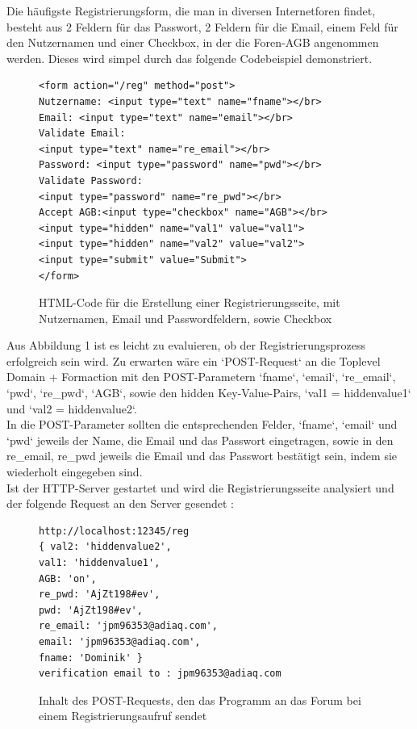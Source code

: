 Die häufigste Registrierungsform, die man in diversen Internetforen findet, besteht aus 2 Feldern für das Passwort, 2 Feldern für die Email, einem Feld für den Nutzernamen und einer Checkbox, in der die Foren-AGB angenommen werden. Dieses wird simpel durch das folgende Codebeispiel demonstriert.


\begin{figure}[h!]
\begin{lstlisting}[language=HTML5]
<form action="/reg" method="post">
Nutzername: <input type="text" name="fname"></br>
Email: <input type="text" name="email"></br>
Validate Email: 
<input type="text" name="re_email"></br>
Password: <input type="password" name="pwd"></br>
Validate Password: 
<input type="password" name="re_pwd"></br>
Accept AGB:<input type="checkbox" name="AGB"></br>
<input type="hidden" name="val1" value="val1">
<input type="hidden" name="val2" value="val2">
<input type="submit" value="Submit">
</form>
\end{lstlisting}
\caption{HTML-Code für die Erstellung einer Registrierungsseite, mit Nutzernamen, Email und Passwordfeldern, sowie Checkbox}
\end{figure}
\newpage
Aus Abbildung 1 ist es leicht zu evaluieren, ob der Registrierungsprozess erfolgreich sein wird. Zu erwarten wäre ein `POST-Request` an die Toplevel Domain + Formaction mit den POST-Parametern `fname`, `email`, `re\_email`, `pwd`, `re\_pwd`, `AGB`, sowie den hidden Key-Value-Pairs, `val1 = hiddenvalue1` und `val2 = hiddenvalue2`.\\
In die POST-Parameter sollten die entsprechenden Felder, `fname`, `email` und `pwd` jeweils der Name, die Email und das Passwort eingetragen, sowie in den re\_email, re\_pwd jeweils die Email und das Passwort bestätigt sein, indem sie wiederholt eingegeben sind.\\
Ist der HTTP-Server gestartet und wird die Registrierungsseite analysiert und der folgende Request an den Server gesendet :

\begin{figure}[ht]
\begin{lstlisting}[language=HTML5]
http://localhost:12345/reg
{ val2: 'hiddenvalue2',
val1: 'hiddenvalue1',
AGB: 'on',
re_pwd: 'AjZt198#ev',
pwd: 'AjZt198#ev',
re_email: 'jpm96353@adiaq.com',
email: 'jpm96353@adiaq.com',
fname: 'Dominik' }
verification email to : jpm96353@adiaq.com
\end{lstlisting}
\caption{Inhalt des POST-Requests, den das Programm an das Forum bei einem Registrierungsaufruf sendet}
\end{figure}

